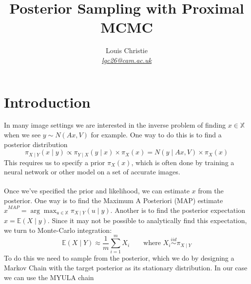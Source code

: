 \documentclass[a4paper,10pt]{article}
\newcommand{\EE}{\mathbb{E}}
\numberwithin{equation}{section}
\numberwithin{thm}{section}
\begin{document}
\title{Posterior Sampling with Proximal MCMC}
\author{Louis Christie \\ \href{mailto:lgc26@cam.ac.uk}{\textit{lgc26@cam.ac.uk}} }
\maketitle

\doublespacing


\section{Introduction}

In many image settings we are interested in the inverse problem of finding $x \in \mathbb{X}$ when we see $y \sim N( Ax, V )$ for example. One way to do this is to find a posterior distribution 
\begin{equation}
\label{eq:posterior}
\pi_{X \mid Y} (x \mid y ) \propto \pi_{Y \mid X } ( y \mid x ) \times \pi_X (x) = N( y \mid Ax, V) \times \pi_X(x)
\end{equation}
This requires us to specify a prior $\pi_X(x)$, which is often done by training a neural network or other model on a set of accurate images. \\
\\
Once we've specified the prior and likelihood, we can estimate $x$ from the posterior. One way is to find the Maximum A Posteriori (MAP) estimate $\hat{x}^{MAP} = \arg \max_{u \in \mathbb{X} } \pi_{X \mid Y}(u \mid y)$. Another is to find the posterior expectation $\hat{x} = \EE( X \mid y )$. Since it may not be possible to analytically find this expectation, we turn to Monte-Carlo integration:
\begin{equation}
 \EE( X \mid Y ) \approx \frac{1}{m} \sum_{i = 1}^m X_i \qquad \text{where } X_i \overset{iid}{\sim} \pi_{X \mid Y}
\end{equation}
To do this we need to sample from the posterior, which we do by designing a Markov Chain with the target posterior as its stationary distribution. In our case we can use the MYULA chain
\end{document}
